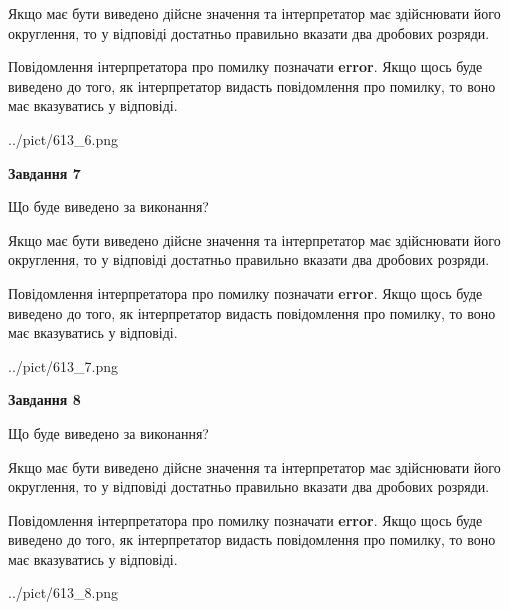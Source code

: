 \documentclass[12pt, ukrainian]{article}
\begin{document}
{\begin {Large}
Якщо має бути виведено дійсне значення та інтерпретатор має здійснювати його округлення, 
то у відповіді достатньо правильно вказати два дробових розряди.

Повідомлення інтерпретатора про помилку позначати \textbf{error}.
Якщо щось буде виведено до того, як інтерпретатор видасть повідомлення про помилку, 
то воно має вказуватись у відповіді. \par

\begin{center}
	{../pict/613_6.png}
\end{center}
\newpage

{\begin {center}\textbf{Завдання 7}\end {center}}\par
Що буде виведено за виконання? \par

Якщо має бути виведено дійсне значення та інтерпретатор має здійснювати його округлення, 
то у відповіді достатньо правильно вказати два дробових розряди.

Повідомлення інтерпретатора про помилку позначати \textbf{error}.
Якщо щось буде виведено до того, як інтерпретатор видасть повідомлення про помилку, 
то воно має вказуватись у відповіді. \par

\begin{center}
	{../pict/613_7.png}
\end{center}
\newpage

{\begin {center}\textbf{Завдання 8}\end {center}}\par
Що буде виведено за виконання? \par

Якщо має бути виведено дійсне значення та інтерпретатор має здійснювати його округлення, 
то у відповіді достатньо правильно вказати два дробових розряди.

Повідомлення інтерпретатора про помилку позначати \textbf{error}.
Якщо щось буде виведено до того, як інтерпретатор видасть повідомлення про помилку, 
то воно має вказуватись у відповіді. \par

\begin{center}
	{../pict/613_8.png}
\end{center}
\newpage


\end{Large}}
\end{document}
